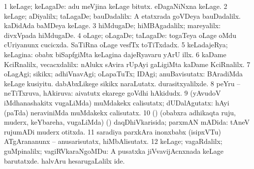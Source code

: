 {\bentry
{} 
\gl{\upa}
\bmng
\bnum
\num{1} keLage; keLagaDe:  adu meVjina keLage bitutx.  eDagaNiNxna keLage. 
\num{2} keLage; aDiyalilx; taLagaDe; bauDadalilx:  A etatxrada goVDeya bauDadalilx.  kaDidAda baMDeya keLage. 
\num{3} hiMdugaDe; hiMBAgadalilx; mareyalilx:  divxVpada hiMdugaDe. 
\num{4} oLage; oLagaDe; taLagaDe:  togaTeya oLage oMdu cUriyanunx cucicxda.  SaTiRna oLage vesfTx toTiTxdadx. 
\num{5} keLadajeRya; keLagina:  obabx biSapfgiMta keLagina dajeRyavaru yArU illx. 
\num{6} kaDame KciRnalilx, vecacxdalilx:  nAlukx sAvira rUpAyi gaLigiMta kaDame KciRnalilx. 
\num{7} oLagAgi; sikikx; adhiVnavAgi; oLapaTuTx; IDAgi; anuBavisutatx:  BAradiMda keLage kusiyitu.  dabAbxLikege sikikx naraLutatx.  durasitxyalilxde. 
\num{8} peYru -- neTiTxruva, hAkiruva:  aivatutx ekarege goVdhi hAkidudx. 
\num{9} (yAvudoV iMdhanashakitx \mo vugaLiMda) muMdakekx calisutatx; dUDalAgutatx:  hAyi (paTda) neraviniMda muMdakekx calisutatx. 
\num{10} (\pArxparx) (obabxra adhikaqta ruju, muderx, keYbareha, \mo vugaLiMda) (\kanmu) daqDhiVkarisida; parxmAN mADida:  tAneV rujumADi muderx otitxda. 
\num{11} saradiya parxkAra inonxbabx (isipxVTu) ATgArananunx -- anusarisutatx, hiMbAlisutatx. 
\num{12} keLage; vagaRdalilx; guMpinalilx; vagiRVkaraNgoMDu:  A pusatxka jiVvavijAcnxnada keLage barutatxde.  halvAru hesarugaLalilx ide. 
\enum
\emng

}
